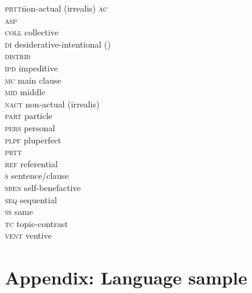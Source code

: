 \documentclass[output=paper]{langsci/langscibook}
\begin{document}
\begin{multicols}{2}
\begin{tabbing}
\textsc{prtt}\hspace{5mm}\=non-actual (irrealis) \hspace{5mm}\kill
\textsc{ac}  \>                 \\
\textsc{asp} \>                           \\
\textsc{coll}   \>  collective                  \\
\textsc{di} \>  desiderative-intentional () \\
\textsc{distrib}\>                 \\
\textsc{ipd} \> impeditive                      \\
\textsc{mc}  \> main clause                      \\
\textsc{mid} \> middle                     \\
\textsc{nact}\>  non-actual (irrealis)      \\
\textsc{part}\>  particle                       \\
\textsc{pers}\>  personal                       \\
\textsc{plpf}\>  pluperfect                     \\
\textsc{prtt}\>                        \\
\textsc{ref} \> referential                     \\
\textsc{s}  \>    sentence/clause              \\
\textsc{sben}\>  self-benefactive               \\
\textsc{seq} \> sequential                      \\
\textsc{ss} \>  same                    \\
\textsc{tc} \>  topic-contrast                  \\
\textsc{vent}\>  ventive                        
\end{tabbing}
\end{multicols}


\section*{Appendix: Language sample}
 
\end{document}
